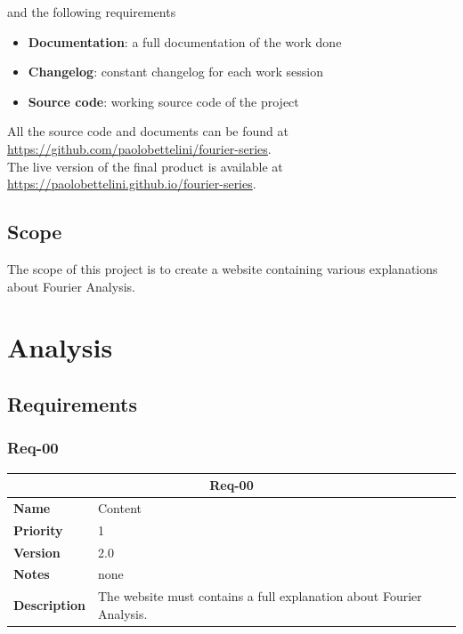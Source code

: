 \documentclass{article}
\begin{document}
and the following requirements

\begin{itemize}
    \item \textbf{Documentation}: a full documentation of the work done
    \item \textbf{Changelog}: constant changelog for each work session
    \item \textbf{Source code}: working source code of the project
\end{itemize}

All the source code and documents can be found at \href{https://github.com/paolobettelini/fourier-series}{https://github.com/paolobettelini/fourier-series}.
\\
The live version of the final product is available at \href{https://paolobettelini.github.io/fourier-series}{https://paolobettelini.github.io/fourier-series}.

\subsection{Scope}

The scope of this project is to create a website containing various explanations about Fourier Analysis.

\pagebreak

\section{Analysis}

\subsection{Requirements}

\subsubsection{Req-00}

\bgroup{}
\def\arraystretch{1.25}
\begin{center}
    \begin{tabular}{ |l|p{9cm}| }
        \hline
        \multicolumn{2}{|c|}{\textbf{Req-00}} \\
        \hline
        \textbf{Name} & Content \\
        \hline
        \textbf{Priority} & 1 \\
        \hline
        \textbf{Version} & 2.0 \\
        \hline
        \textbf{Notes} & none \\
        \hline
        \textbf{Description}
        & The website must contains a full explanation about Fourier Analysis. \\
        \hline
    \end{tabular}
\end{center}
\egroup{}
\end{document}
